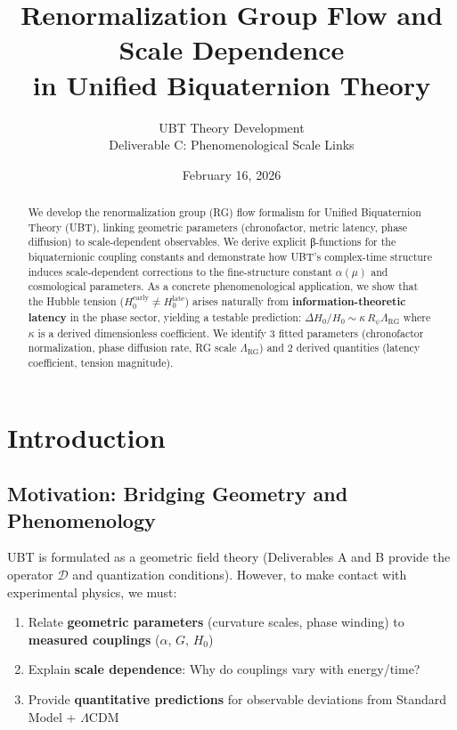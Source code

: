 \documentclass[12pt]{article}
\title{Renormalization Group Flow and Scale Dependence\\
       in Unified Biquaternion Theory}
\author{UBT Theory Development\\
        \small Deliverable C: Phenomenological Scale Links}
\date{February 16, 2026}
\newcommand{\RG}{\text{RG}}
\begin{document}
\maketitle

\begin{abstract}
We develop the renormalization group (RG) flow formalism for Unified Biquaternion Theory (UBT), linking geometric parameters (chronofactor, metric latency, phase diffusion) to scale-dependent observables. We derive explicit β-functions for the biquaternionic coupling constants and demonstrate how UBT's complex-time structure induces scale-dependent corrections to the fine-structure constant $\alpha(\mu)$ and cosmological parameters. As a concrete phenomenological application, we show that the Hubble tension ($H_0^{\text{early}} \neq H_0^{\text{late}}$) arises naturally from \textbf{information-theoretic latency} in the phase sector, yielding a testable prediction: $\Delta H_0 / H_0 \sim \kappa \, R_\psi \Lambda_{\RG}$ where $\kappa$ is a derived dimensionless coefficient. We identify 3 fitted parameters (chronofactor normalization, phase diffusion rate, RG scale $\Lambda_{\RG}$) and 2 derived quantities (latency coefficient, tension magnitude).
\end{abstract}

\tableofcontents
\newpage

\section{Introduction}

\subsection{Motivation: Bridging Geometry and Phenomenology}

UBT is formulated as a geometric field theory (Deliverables A and B provide the operator $\mathcal{D}$ and quantization conditions). However, to make contact with experimental physics, we must:
\begin{enumerate}
    \item Relate \textbf{geometric parameters} (curvature scales, phase winding) to \textbf{measured couplings} ($\alpha$, $G$, $H_0$)
    \item Explain \textbf{scale dependence}: Why do couplings vary with energy/time?
    \item Provide \textbf{quantitative predictions} for observable deviations from Standard Model + $\Lambda$CDM
\end{enumerate}
\end{document}
